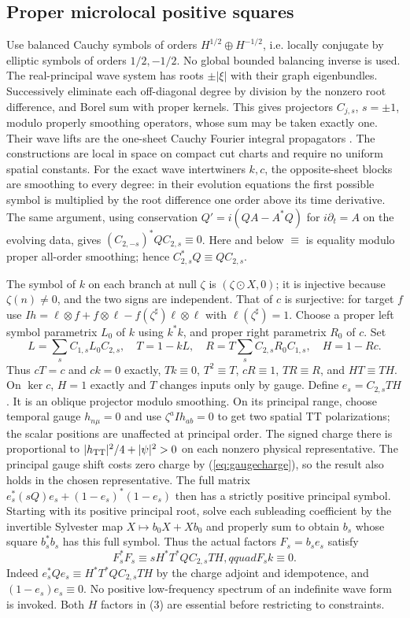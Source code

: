\documentclass[11pt]{article}
\begin{document}
\subsection{Proper microlocal positive squares}
Use balanced Cauchy symbols of orders $H^{1/2}\oplus H^{-1/2}$,
i.e. locally conjugate by elliptic symbols of orders $1/2,-1/2$.
No global bounded balancing inverse is used. The real-principal wave
system has roots $\pm|\xi|$ with their graph eigenbundles. Successively
eliminate each off-diagonal degree by division by the nonzero root
difference, and Borel sum with proper kernels. This gives projectors
$C_{j,s}$, $s=\pm1$, modulo properly smoothing operators, whose sum
may be taken exactly one. Their wave lifts are the one-sheet Cauchy
Fourier integral propagators \cite{gow}. The constructions are local
in space on compact cut charts and require no uniform spatial constants.
For the exact wave intertwiners $k,c$, the opposite-sheet blocks are
smoothing to every degree: in their evolution equations the first
possible symbol is multiplied by the root difference one order above
its time derivative. The same argument, using conservation
$Q'=i(QA-A^*Q)$ for $i\partial_t=A$ on the evolving data, gives
$(C_{2,-s})^*Q C_{2,s}\equiv0$. Here and below $\equiv$ is equality
modulo proper all-order smoothing; hence $C_{2,s}^*Q\equiv QC_{2,s}$.

The symbol of $k$ on each branch at null $\zeta$ is $(\zeta\odot X,0)$;
it is injective because $\zeta(n)\ne0$, and the two signs are
independent. That of $c$ is surjective: for target $f$ use
$Ih=\ell\otimes f+f\otimes\ell-f(\zeta^\sharp)\ell\otimes\ell$
with $\ell(\zeta^\sharp)=1$. Choose a proper left symbol parametrix
$L_0$ of $k$ using $k^*k$, and proper right parametrix $R_0$ of $c$.
Set
\[
 L=\sum_s C_{1,s}L_0C_{2,s},\quad T=1-kL,\quad
 R=T\sum_s C_{2,s}R_0 C_{1,s},\quad H=1-Rc .
\]
Thus $cT=c$ and $ck=0$ exactly, $Tk\equiv0$, $T^2\equiv T$,
$cR\equiv1$, $TR\equiv R$, and $HT\equiv TH$. On $\ker c$,
$H=1$ exactly and $T$ changes inputs only by gauge. Define
$e_s=C_{2,s}TH$. It is an oblique projector modulo smoothing.
On its principal range, choose temporal gauge $h_{n\mu}=0$ and
use $\zeta^a Ih_{ab}=0$ to get two spatial TT polarizations; the
scalar positions are unaffected at principal order. The signed
charge there is proportional to
$|h_{\rm TT}|^2/4+|\psi|^2>0$ on each nonzero physical representative.
The principal gauge shift costs zero charge by
(\ref{eq:gaugecharge}), so the result also holds in the chosen
representative. The full matrix
$e_s^*(sQ)e_s+(1-e_s)^*(1-e_s)$ then has a strictly positive
principal symbol. Starting with its positive principal root, solve
each subleading coefficient by the invertible Sylvester map
$X\mapsto b_0X+Xb_0$ and properly sum to obtain $b_s$ whose
square $b_s^*b_s$ has this full symbol. Thus the actual factors
$F_s=b_s e_s$ satisfy
\begin{equation}
 F_s^*F_s\equiv sH^*T^*Q C_{2,s}TH,qquad F_s k\equiv0 .       \label{eq:formal}
\end{equation}
Indeed $e_s^*Qe_s\equiv H^*T^*Q C_{2,s}TH$ by the charge adjoint
and idempotence, and $(1-e_s)e_s\equiv0$. No positive low-frequency
spectrum of an indefinite wave form is invoked. Both $H$ factors in
(3) are essential before restricting to constraints.
\end{document}
